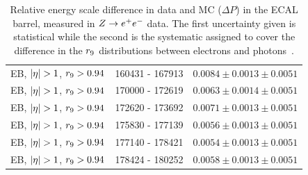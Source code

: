 \begin{table}[hbt]
\begin{tabular}{|c|c|c|}
\hline				    			  		  
EB, $ |\eta| > 1 $, $r_{9} > 0.94$ & 160431 - 167913 & $ 0.0084 \pm 0.0013 \pm 0.0051$ \\
EB, $ |\eta| > 1 $, $r_{9} > 0.94$ & 170000 - 172619 & $ 0.0063 \pm 0.0014 \pm 0.0051$ \\
EB, $ |\eta| > 1 $, $r_{9} > 0.94$ & 172620 - 173692 & $ 0.0071 \pm 0.0013 \pm 0.0051$ \\
EB, $ |\eta| > 1 $, $r_{9} > 0.94$ & 175830 - 177139 & $ 0.0056 \pm 0.0013 \pm 0.0051$ \\
EB, $ |\eta| > 1 $, $r_{9} > 0.94$ & 177140 - 178421 & $ 0.0054 \pm 0.0013 \pm 0.0051$ \\
EB, $ |\eta| > 1 $, $r_{9} > 0.94$ & 178424 - 180252 & $ 0.0058 \pm 0.0013 \pm 0.0051$ \\
\hline
\hline
\end{tabular}
\caption{Relative energy scale difference in data and MC ($\Delta P$) in the ECAL barrel,
measured in $Z\rightarrow e^{+}e^{-}$ data. 
The first uncertainty given is statistical while the second is the systematic
assigned to cover the difference in the  $r_{9}$ distributions between electrons
and photons~\citep{AN-12-160}.}
\label{tab:escale2011eb}
\end{table}

